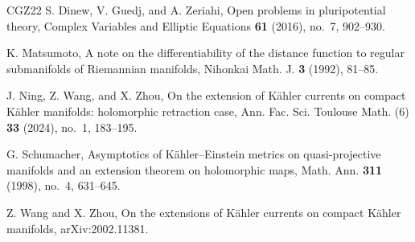 \documentclass[12pt,reqno]{amsart}
\begin{document}
\begin{thebibliography}{CGZ22}
		S. Dinew, V. Guedj, and A. Zeriahi,
		Open problems in pluripotential theory,
		Complex Variables and Elliptic Equations {\bf 61} (2016), no.~7, 902--930.
		
		K. Matsumoto,
		A note on the differentiability of the distance function to regular submanifolds of Riemannian manifolds,
		Nihonkai Math. J. {\bf 3} (1992), 81--85.
		
		J. Ning, Z. Wang, and X. Zhou,
		On the extension of K\"ahler currents on compact K\"ahler manifolds: holomorphic retraction case,
		Ann. Fac. Sci. Toulouse Math. (6) {\bf 33} (2024), no.~1, 183--195.
		
		G. Schumacher,
		Asymptotics of K\"ahler--Einstein metrics on quasi-projective manifolds and an extension theorem on holomorphic maps,
		Math. Ann. {\bf 311} (1998), no.~4, 631--645.
		
		Z. Wang and X. Zhou,
		On the extensions of K\"ahler currents on compact K\"ahler manifolds,
		arXiv:2002.11381.
	\end{thebibliography}
	
\end{document}
